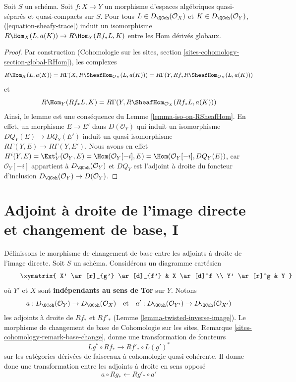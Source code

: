 \begin{lemma}
\label{lemma-iso-global-hom}
Soit $S$ un schéma.
Soit $f : X \to Y$ un morphisme d'espaces algébriques quasi-séparés et quasi-compacts
sur $S$.
Pour tous $L \in D_\QCoh(\mathcal{O}_X)$ et $K \in D_\QCoh(\mathcal{O}_Y)$,
(\ref{equation-sheafy-trace}) induit un isomorphisme
$R\Hom_X(L, a(K)) \to R\Hom_Y(Rf_*L, K)$ entre les Hom dérivés globaux.
\end{lemma}

\begin{proof}
Par construction (Cohomologie sur les sites, section
\ref{sites-cohomology-section-global-RHom}), les complexes
$$
R\Hom_X(L, a(K)) =
R\Gamma(X, R\SheafHom_{\mathcal{O}_X}(L, a(K))) =
R\Gamma(Y, Rf_*R\SheafHom_{\mathcal{O}_X}(L, a(K)))
$$
et
$$
R\Hom_Y(Rf_*L, K) = R\Gamma(Y, R\SheafHom_{\mathcal{O}_X}(Rf_*L, a(K)))
$$
Ainsi, le lemme est une conséquence du Lemme \ref{lemma-iso-on-RSheafHom}.
En effet, un morphisme $E \to E'$ dans $D(\mathcal{O}_Y)$ qui induit
un isomorphisme $DQ_Y(E) \to DQ_Y(E')$ induit un quasi-isomorphisme
$R\Gamma(Y, E) \to R\Gamma(Y, E')$. Nous avons en effet
$H^i(Y, E) = \Ext^i_Y(\mathcal{O}_Y, E) = \Hom(\mathcal{O}_Y[-i], E) =
\Hom(\mathcal{O}_Y[-i], DQ_Y(E))$, car $\mathcal{O}_Y[-i]$
appartient à $D_\QCoh(\mathcal{O}_Y)$ et $DQ_Y$ est l'adjoint à droite
du foncteur d'inclusion $D_\QCoh(\mathcal{O}_Y) \to D(\mathcal{O}_Y)$.
\end{proof}







 
\section{Adjoint à droite de l'image directe et changement de base, I}
\label{section-base-change-map}

\noindent
Définissons le morphisme de changement de base entre les adjoints à droite de l'image directe.
Soit $S$ un schéma. Considérons un diagramme cartésien
\begin{equation}
\label{equation-base-change}
\vcenter{
\xymatrix{
X' \ar[r]_{g'} \ar[d]_{f'} & X \ar[d]^f \\
Y' \ar[r]^g & Y
}
}
\end{equation}
où $Y'$ et $X$ sont {\bf indépendants au sens de Tor} sur $Y$. Notons
$$
a  : D_\QCoh(\mathcal{O}_Y) \to D_\QCoh(\mathcal{O}_X)
\quad\text{et}\quad
a' : D_\QCoh(\mathcal{O}_{Y'}) \to D_\QCoh(\mathcal{O}_{X'})
$$
les adjoints à droite de $Rf_*$ et $Rf'_*$
(Lemme \ref{lemma-twisted-inverse-image}).
Le morphisme de changement de base de
Cohomologie sur les sites, Remarque \ref{sites-cohomology-remark-base-change},
donne une transformation de foncteurs
$$
Lg^* \circ Rf_* \longrightarrow Rf'_* \circ L(g')^*
$$
sur les catégories dérivées de faisceaux à cohomologie quasi-cohérente.
Il donne donc une transformation entre les adjoints à droite en sens opposé
$$
a \circ Rg_* \longleftarrow Rg'_* \circ a'
$$

